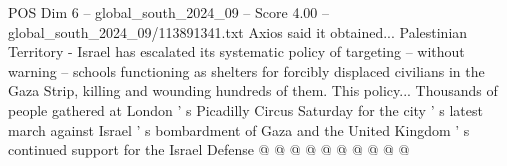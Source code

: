 \begin{textsample}{POS Dim 6 – global\_south\_2024\_09 – Score 4.00 – global\_south\_2024\_09/113891341.txt}
Axios said it obtained...
Palestinian Territory - Israel has escalated its systematic policy of targeting -- without warning -- schools functioning as shelters for forcibly displaced civilians in the Gaza Strip, killing and wounding hundreds of them.
This policy...
Thousands of people gathered at London ' s Picadilly Circus Saturday for the city ' s latest march against Israel ' s bombardment of Gaza and the United Kingdom ' s continued support for the Israel Defense @ @ @ @ @ @ @ @ @ @

\end{textsample}
